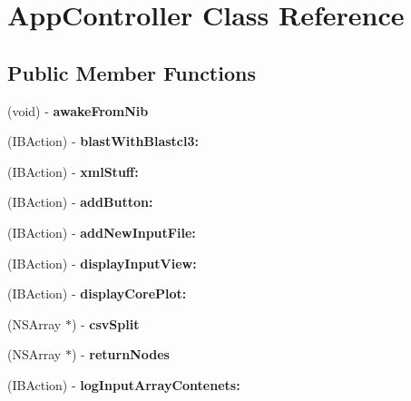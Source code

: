\hypertarget{interface_app_controller}{
\section{AppController Class Reference}
\label{interface_app_controller}
}
\subsection*{Public Member Functions}
\begin{DoxyCompactItemize}
\item 
\hypertarget{interface_app_controller_a9f2f41bdf220e38e4ce86420fbaf5222}{
(void) -\/ {\bfseries awakeFromNib}}
\label{interface_app_controller_a9f2f41bdf220e38e4ce86420fbaf5222}

\item 
\hypertarget{interface_app_controller_aec0dcb44cd5931c61d0a060895468bed}{
(IBAction) -\/ {\bfseries blastWithBlastcl3:}}
\label{interface_app_controller_aec0dcb44cd5931c61d0a060895468bed}

\item 
\hypertarget{interface_app_controller_a2be22d5da5142f68e882f4a787dc0fc5}{
(IBAction) -\/ {\bfseries xmlStuff:}}
\label{interface_app_controller_a2be22d5da5142f68e882f4a787dc0fc5}

\item 
\hypertarget{interface_app_controller_a43f5b99f52c1cef4ffc2874d436d5708}{
(IBAction) -\/ {\bfseries addButton:}}
\label{interface_app_controller_a43f5b99f52c1cef4ffc2874d436d5708}

\item 
\hypertarget{interface_app_controller_a82e5edff75567d79352fd2653ec2d74a}{
(IBAction) -\/ {\bfseries addNewInputFile:}}
\label{interface_app_controller_a82e5edff75567d79352fd2653ec2d74a}

\item 
\hypertarget{interface_app_controller_a131ab134935ad5c82fd520a80364abc5}{
(IBAction) -\/ {\bfseries displayInputView:}}
\label{interface_app_controller_a131ab134935ad5c82fd520a80364abc5}

\item 
\hypertarget{interface_app_controller_ade437944fd47a73d24075aa8bfc46a8e}{
(IBAction) -\/ {\bfseries displayCorePlot:}}
\label{interface_app_controller_ade437944fd47a73d24075aa8bfc46a8e}

\item 
\hypertarget{interface_app_controller_acfc37ff8b98bccf42417630198f566d4}{
(NSArray $\ast$) -\/ {\bfseries csvSplit}}
\label{interface_app_controller_acfc37ff8b98bccf42417630198f566d4}

\item 
\hypertarget{interface_app_controller_a026ea638746f78eb792ca08f5b9dc5e8}{
(NSArray $\ast$) -\/ {\bfseries returnNodes}}
\label{interface_app_controller_a026ea638746f78eb792ca08f5b9dc5e8}

\item 
\hypertarget{interface_app_controller_abfff4d14ab26df07bb99490269abd835}{
(IBAction) -\/ {\bfseries logInputArrayContenets:}}
\label{interface_app_controller_abfff4d14ab26df07bb99490269abd835}

\end{DoxyCompactItemize}
